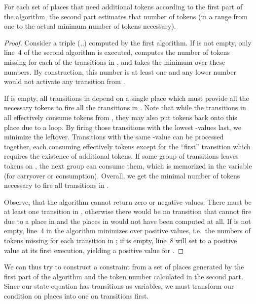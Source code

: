 \documentclass{LMCS}
\begin{document}
\begin{lem}\label{L.ALG2}
For each set of places  that need additional tokens according to the first part of the algorithm, the second
part estimates that number of tokens (in a range from one to the actual minimum number of tokens necessary).
\end{lem}
\begin{proof}
Consider a triple (,,) computed by the first algorithm.
If  is not empty, only line~4 of the second algorithm is executed, computes the number of tokens missing
for each of the transitions in , and takes the minimum over these numbers. By construction, this number is
at least one and any lower number would not activate any transition from . 

If  is empty, all transitions in  depend on a single place which must provide all the
necessary tokens to fire all the transitions in . 
Note that while the transitions in  all effectively consume tokens from , they may also put tokens back onto this
place due to a loop. By firing those transitions with the lowest -values last, we minimize the leftover.
Transitions with the same -value  can be processed together, each consuming effectively  tokens
except for the ``first'' transition which requires the existence of  additional tokens. 
If some group  of transitions leaves tokens
on , the next group can consume them, which is memorized in the variable  (for carryover or consumption).
Overall, we get the minimal number of tokens necessary to fire all transitions in .

Observe, that the algorithm cannot return zero or negative values: 
There must be at least one transition in , otherwise
there would be no transition that cannot fire due to a place in  and the places in  would not have been
computed at all. If  is not empty, line~4 in the algorithm minimizes over positive values, i.e.\ the
numbers of tokens missing for each transition in ; if 
is empty, line~8 will set  to a positive value at its first execution, yielding a positive value for . 
\end{proof}

We can thus try to construct a constraint from a set of places  generated by the first part of the algorithm
and the token number calculated in the second part. Since our state equation has transitions as variables, we
must transform our condition on places into one on transitions first. 
\end{document}
